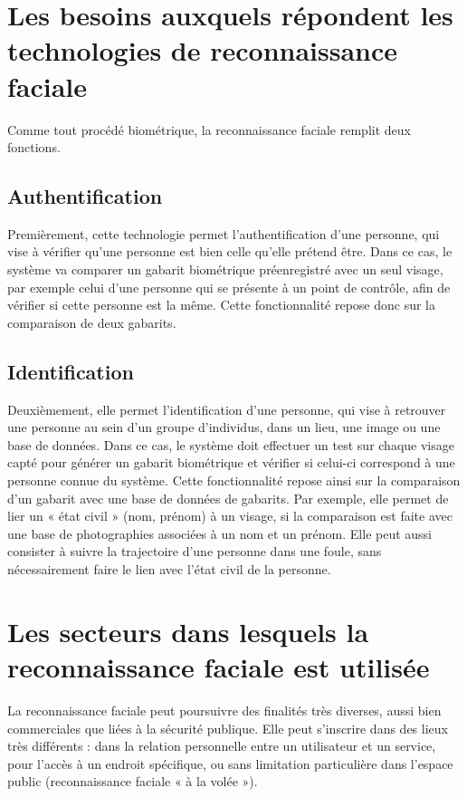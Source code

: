 \documentclass[12pt,french]{article}
\theoremstyle{plain}
\theoremstyle{definition}
\begin{document}
\section{Les besoins auxquels répondent les technologies de reconnaissance faciale}
Comme tout procédé biométrique, la reconnaissance faciale remplit deux fonctions.

\subsection{Authentification}
Premièrement, cette technologie permet l’authentification d’une personne, qui vise à vérifier qu’une personne est bien celle qu’elle prétend être. Dans ce cas, le système va comparer un gabarit biométrique préenregistré avec un seul visage, par exemple celui d’une personne qui se présente à un point de contrôle, afin de vérifier si cette personne est la même.
Cette fonctionnalité repose donc sur la comparaison de deux gabarits. 

\subsection{Identification}
Deuxièmement, elle permet l’identification d’une personne, qui vise à retrouver une personne au sein d’un groupe d’individus, dans un lieu, une image ou une base de données.
Dans ce cas, le système doit effectuer un test sur chaque visage capté pour générer un gabarit biométrique et vérifier si celui-ci correspond à une personne connue du système.
Cette fonctionnalité repose ainsi sur la comparaison d’un gabarit avec une base de données de gabarits.
Par exemple, elle permet de lier un « état civil » (nom, prénom) à un visage, si la comparaison est faite avec une base de photographies associées à un nom et un prénom.
Elle peut aussi consister à suivre la trajectoire d’une personne dans une foule, sans nécessairement faire le lien avec l’état civil de la personne.

\section{Les secteurs dans lesquels la reconnaissance faciale est utilisée}
La reconnaissance faciale peut poursuivre des finalités très diverses, aussi bien commerciales que liées à la sécurité publique.
Elle peut s’inscrire dans des lieux très différents : dans la relation personnelle entre un utilisateur et un service, pour l’accès à un endroit spécifique, ou sans limitation particulière dans l’espace public (reconnaissance faciale « à la volée »).
\end{document}
